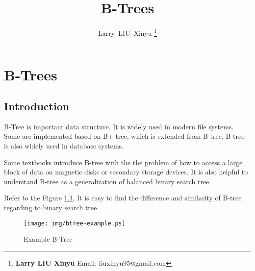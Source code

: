 \documentclass{article}
\begin{document}


\title{B-Trees}

\author{Larry~LIU~Xinyu
\thanks{{\bfseries Larry LIU Xinyu } \newline
  Email: liuxinyu95@gmail.com \newline}
  }

\maketitle
\fi


\ifx\wholebook\relax
\chapter{B-Trees}
\fi


\section{Introduction}
\label{introduction}

B-Tree is important data structure.
It is widely used in modern file systems. Some
are implemented based on B+ tree, which is extended from B-tree.
B-tree is also widely used in database systems.

Some textbooks introduce B-tree with the the problem of how to access a
large block of data on magnetic disks or secondary storage devices\cite{CLRS}.
It is also helpful to understand B-tree as a generalization of balanced binary
search tree\cite{wiki-b-tree}.

Refer to the Figure \ref{fig:btree-example}, It is easy to find the difference
and similarity of B-tree regarding to binary search tree.

\begin{figure}[htbp]
   \begin{center}
	\texttt{[image: img/btree-example.ps]}
   \caption{Example B-Tree} \label{fig:btree-example}
   \end{center}
\end{figure}
\end{document}
